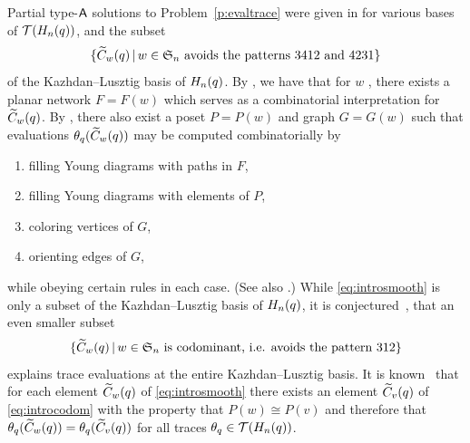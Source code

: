 \documentclass[11pt]{article}
\theoremstyle{definition}
\numberwithin{equation}{section}
\begin{document}
Partial type-$\mathsf{A}$ solutions to Problem~\ref{p:evaltrace}
were given in \cite{CHSSkanEKL, SkanCCS}
for various bases of $\mathcal{T}(H_n(q))$, and
the subset
\begin{equation}\label{eq:introsmooth}
  \{ \wtc wq \,|\, w \in \sn \text{ \avoidsp} \}
\end{equation}
of the Kazhdan--Lusztig basis of $H_n(q)$.
By \cite[Thm.\,4.3]{SkanNNDCB},
we have that for $w$ \avoidingp, there exists a planar network $F = F(w)$
which serves as a combinatorial interpretation for $\widetilde{C}_{w}(q)$.
By \cite[Thm.\,7.4]{CHSSkanEKL},
there also exist
a poset $P = P(w)$
and graph $G = G(w)$
such that
evaluations $\theta_q( \widetilde{C}_{w}(q) )$ may be computed combinatorially
by
\begin{enumerate}
\item filling Young diagrams with paths in $F$,
\item filling Young diagrams with elements of $P$,
\item coloring vertices of $G$, 
\item orienting edges of $G$,
\end{enumerate}
while obeying certain rules in each case.
(See also \cite{AthanPSE, SWachsChromQF, StanSymm}.)
While \eqref{eq:introsmooth} is only a subset of the Kazhdan--Lusztig basis
of $H_n(q)$, it is conjectured~\cite[Conj.\,1.9]{ANigroUpdate},
\cite[Conj.\.3.1]{HaimanHecke} that an even smaller subset
\begin{equation}\label{eq:introcodom}
  \{ \wtc wq \,|\, w \in \sn
  \text{ is codominant, i.e. avoids the pattern } 312 \}
\end{equation}
explains trace evaluations at the entire Kazhdan--Lusztig basis.
It is known~\cite[Thm.\,4.6]{CHSSkanEKL}
that for each element $\widetilde{C}_{w}(q)$ of \eqref{eq:introsmooth}
there exists an element $\widetilde{C}_{v}(q)$ of \eqref{eq:introcodom}
with the property that $P(w) \cong P(v)$
and therefore that $\theta_q(\widetilde{C}_{w}(q)) = \theta_q(\widetilde{C}_{v}(q))$ for all traces
$\theta_q \in \mathcal{T}(H_n(q))$.
\end{document}
